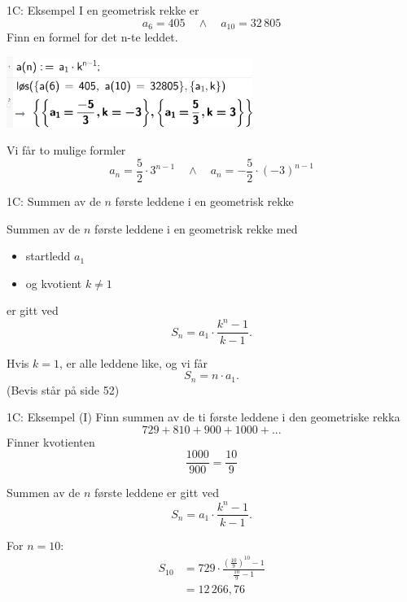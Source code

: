 \greenheader
\begin{frame}{1C: Eksempel}
I en geometrisk rekke er 
\[
a_6=405 \quad \wedge \quad a_{10}=32\,805
\]
Finn en formel for det n-te leddet.
\begin{center}
\includegraphics[width=0.6\textwidth]{R2K1C-1.png}
\end{center}
Vi får to mulige formler
\[
a_n=\frac{5}{2}\cdot 3^{n-1}\quad\wedge\quad a_n=-\frac{5}{2}\cdot (-3)^{n-1}
\]
\end{frame}


\redheader
\begin{frame}{1C: Summen av de $n$ første leddene i en geometrisk rekke}


Summen av de $n$ første leddene i en geometrisk rekke med
\begin{itemize}
    \item startledd $a_1$ \\
    \item og kvotient $k \neq 1$
\end{itemize}

\medskip
er gitt ved
\[
S_n = a_1 \cdot \frac{k^n - 1}{k - 1}.
\]

\medskip
Hvis $k=1$, er alle leddene like, og vi får
\[
S_n = n \cdot a_1.
\]
(Bevis står på side 52)
\end{frame}

\greenheader
\begin{frame}{1C: Eksempel (I)}
Finn summen av de ti første leddene i den geometriske rekka 
\[
729+810+900+1000+...
\]
Finner kvotienten
\[
\frac{1000}{900}=\frac{10}{9}
\]

\medskip
Summen av de $n$ første leddene er gitt ved
\[
S_n = a_1 \cdot \frac{k^n - 1}{k - 1}.
\]

\medskip
For $n=10$:
\begin{align*}
S_{10} &= 729 \cdot \frac{\left(\tfrac{10}{9}\right)^{10} - 1}{\tfrac{10}{9} - 1}\\
&= 12\,266,76
\end{align*}
\end{frame}

